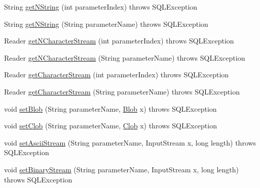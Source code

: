 \begin{DoxyCompactItemize}
\item 
String \mbox{\hyperlink{classcom_1_1mysql_1_1cj_1_1jdbc_1_1_callable_statement_wrapper_a0f35a6165ab26337a2d2501ede1e5616}{get\+N\+String}} (int parameter\+Index)  throws S\+Q\+L\+Exception 
\item 
String \mbox{\hyperlink{classcom_1_1mysql_1_1cj_1_1jdbc_1_1_callable_statement_wrapper_a51e2115d2f86be9a535d0eded9cedcf0}{get\+N\+String}} (String parameter\+Name)  throws S\+Q\+L\+Exception 
\item 
Reader \mbox{\hyperlink{classcom_1_1mysql_1_1cj_1_1jdbc_1_1_callable_statement_wrapper_a901c8803e72bd7120f17b9235379d3d5}{get\+N\+Character\+Stream}} (int parameter\+Index)  throws S\+Q\+L\+Exception 
\item 
Reader \mbox{\hyperlink{classcom_1_1mysql_1_1cj_1_1jdbc_1_1_callable_statement_wrapper_a27261d421ab4d0f76421435281a0e69c}{get\+N\+Character\+Stream}} (String parameter\+Name)  throws S\+Q\+L\+Exception 
\item 
Reader \mbox{\hyperlink{classcom_1_1mysql_1_1cj_1_1jdbc_1_1_callable_statement_wrapper_a039096af3fce288f9be2f23fa9639cc9}{get\+Character\+Stream}} (int parameter\+Index)  throws S\+Q\+L\+Exception 
\item 
Reader \mbox{\hyperlink{classcom_1_1mysql_1_1cj_1_1jdbc_1_1_callable_statement_wrapper_a9f98975895bddea7ea81e076697576a6}{get\+Character\+Stream}} (String parameter\+Name)  throws S\+Q\+L\+Exception 
\item 
void \mbox{\hyperlink{classcom_1_1mysql_1_1cj_1_1jdbc_1_1_callable_statement_wrapper_a1851ea6263ffd0bdfb7d9ff99bc0b005}{set\+Blob}} (String parameter\+Name, \mbox{\hyperlink{classcom_1_1mysql_1_1cj_1_1jdbc_1_1_blob}{Blob}} x)  throws S\+Q\+L\+Exception 
\item 
void \mbox{\hyperlink{classcom_1_1mysql_1_1cj_1_1jdbc_1_1_callable_statement_wrapper_af470b6517c5682d0dcb97ba5a8ae6793}{set\+Clob}} (String parameter\+Name, \mbox{\hyperlink{classcom_1_1mysql_1_1cj_1_1jdbc_1_1_clob}{Clob}} x)  throws S\+Q\+L\+Exception 
\item 
void \mbox{\hyperlink{classcom_1_1mysql_1_1cj_1_1jdbc_1_1_callable_statement_wrapper_a8696452651a545d08fa35fcd409653b4}{set\+Ascii\+Stream}} (String parameter\+Name, Input\+Stream x, long length)  throws S\+Q\+L\+Exception 
\item 
void \mbox{\hyperlink{classcom_1_1mysql_1_1cj_1_1jdbc_1_1_callable_statement_wrapper_af8ccc9962716995b1fce2b70f2dfa584}{set\+Binary\+Stream}} (String parameter\+Name, Input\+Stream x, long length)  throws S\+Q\+L\+Exception 

\end{DoxyCompactItemize}
